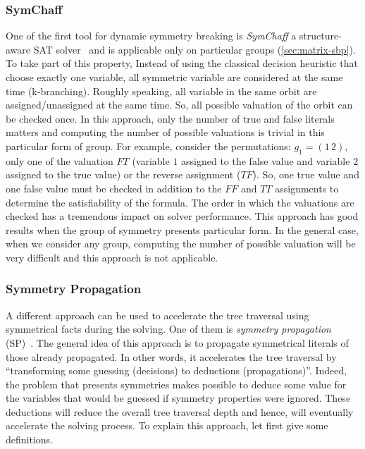\subsubsection{SymChaff}

One of the first tool for dynamic symmetry breaking is \emph{SymChaff} a structure-aware SAT solver~\cite{sabharwal2005symchaff}
and is applicable only on particular groups (\cref{sec:matrix-sbp}).
To take part of this property, Instead of using the classical decision heuristic that choose exactly one
variable, all symmetric variable are considered at the same time (k-branching). 
Roughly speaking,
all variable in the same orbit are assigned/unassigned at the same time. So, all possible valuation 
of the orbit can be checked once. In this approach, only the number of true and false literals matters
and computing the number of possible valuations is trivial in this particular 
form of group. For example, consider the permutations: $g_1 = (1\, 2)$,
only one of the valuation $F T$ (variable $1$ assigned to the false value and variable $2$ assigned to the true value) or the reverse assignment ($T F$).
 So, one true value and one false value must be checked in addition to the 
$F F$ and $T T$ assignments to determine the satisfiability of the formula.
 The order in which the valuations are checked has a tremendous impact on solver performance. 
This approach has good results when the group of symmetry presents particular form.
In the general case, when we consider any group, computing the number of possible valuation will be very difficult and this approach is not applicable.



\subsubsection{Symmetry Propagation}
A different approach can be used to accelerate the tree traversal using symmetrical facts during the solving.
One of them is \emph{symmetry propagation} (SP)~\cite{Devriendt12}.
The general idea of this approach is to propagate symmetrical literals of those already propagated.
In other words, it accelerates the tree traversal by ``transforming some guessing (decisions) to deductions (propagations)''.
Indeed, the problem that presents symmetries makes possible to deduce some value 
for the variables that would be guessed if symmetry properties were ignored.
These deductions will reduce the overall tree traversal depth and hence, will eventually accelerate the solving process. To explain this approach, 
let first give some definitions.

